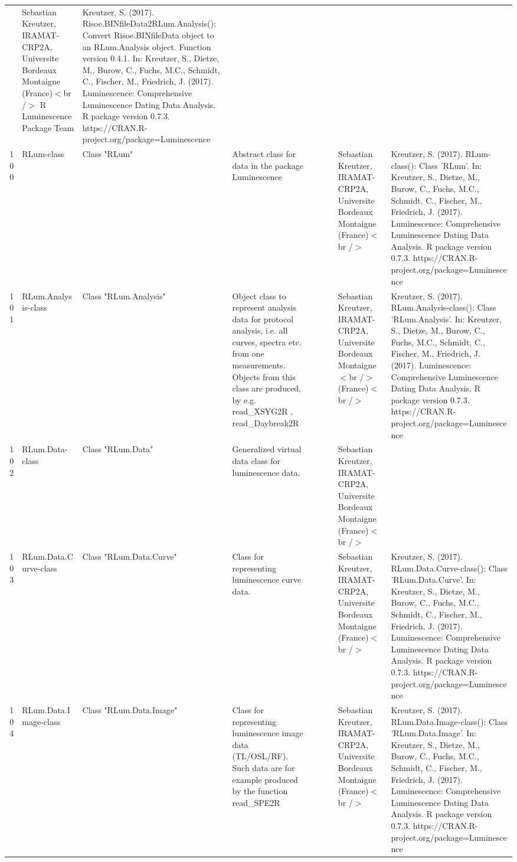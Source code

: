 \begin{table}[ht]
\begin{tabular}{rllllllll}
 & Sebastian Kreutzer, IRAMAT-CRP2A, Universite Bordeaux Montaigne (France)$<$br /$>$  R Luminescence Package Team & Kreutzer, S. (2017). Risoe.BINfileData2RLum.Analysis(): Convert Risoe.BINfileData object to an RLum.Analysis object. Function version 0.4.1. In: Kreutzer, S., Dietze, M., Burow, C., Fuchs, M.C., Schmidt, C., Fischer, M., Friedrich, J. (2017). Luminescence: Comprehensive Luminescence Dating Data Analysis. R package version 0.7.3. https://CRAN.R-project.org/package=Luminescence
 \\ 
  100 & RLum-class & Class  "RLum" & Abstract class for data in the package Luminescence &  &  &  & Sebastian Kreutzer, IRAMAT-CRP2A, Universite Bordeaux Montaigne (France)$<$br /$>$ & Kreutzer, S. (2017). RLum-class(): Class 'RLum'. In: Kreutzer, S., Dietze, M., Burow, C., Fuchs, M.C., Schmidt, C., Fischer, M., Friedrich, J. (2017). Luminescence: Comprehensive Luminescence Dating Data Analysis. R package version 0.7.3. https://CRAN.R-project.org/package=Luminescence
 \\ 
  101 & RLum.Analysis-class & Class  "RLum.Analysis" & Object class to represent analysis data for protocol analysis, i.e. all curves, spectra etc. from one measurements. Objects from this class are produced, by e.g.  read\_XSYG2R , read\_Daybreak2R &  &  &  & Sebastian Kreutzer, IRAMAT-CRP2A, Universite Bordeaux Montaigne$<$br /$>$ (France)$<$br /$>$ & Kreutzer, S. (2017). RLum.Analysis-class(): Class 'RLum.Analysis'. In: Kreutzer, S., Dietze, M., Burow, C., Fuchs, M.C., Schmidt, C., Fischer, M., Friedrich, J. (2017). Luminescence: Comprehensive Luminescence Dating Data Analysis. R package version 0.7.3. https://CRAN.R-project.org/package=Luminescence
 \\ 
  102 & RLum.Data-class & Class  "RLum.Data" & Generalized virtual data class for luminescence data. &  &  &  & Sebastian Kreutzer, IRAMAT-CRP2A, Universite Bordeaux Montaigne (France)$<$br /$>$ &  \\ 
  103 & RLum.Data.Curve-class & Class  "RLum.Data.Curve" & Class for representing luminescence curve data. &  &  &  & Sebastian Kreutzer, IRAMAT-CRP2A, Universite Bordeaux Montaigne (France)$<$br /$>$ & Kreutzer, S. (2017). RLum.Data.Curve-class(): Class 'RLum.Data.Curve'. In: Kreutzer, S., Dietze, M., Burow, C., Fuchs, M.C., Schmidt, C., Fischer, M., Friedrich, J. (2017). Luminescence: Comprehensive Luminescence Dating Data Analysis. R package version 0.7.3. https://CRAN.R-project.org/package=Luminescence
 \\ 
  104 & RLum.Data.Image-class & Class  "RLum.Data.Image" & Class for representing luminescence image data (TL/OSL/RF). Such data are for example produced by the function  read\_SPE2R &  &  &  & Sebastian Kreutzer, IRAMAT-CRP2A, Universite Bordeaux Montaigne (France)$<$br /$>$ & Kreutzer, S. (2017). RLum.Data.Image-class(): Class 'RLum.Data.Image'. In: Kreutzer, S., Dietze, M., Burow, C., Fuchs, M.C., Schmidt, C., Fischer, M., Friedrich, J. (2017). Luminescence: Comprehensive Luminescence Dating Data Analysis. R package version 0.7.3. https://CRAN.R-project.org/package=Luminescence

\end{tabular}
\end{table}
